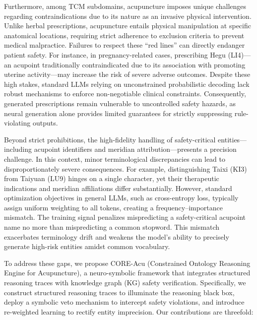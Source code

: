 \documentclass[preprint,5p,times,twocolumn,fleqn]{elsarticle}
\begin{document}
Furthermore, among TCM subdomains, acupuncture imposes unique challenges regarding contraindications due to its nature as an invasive physical intervention. 
Unlike herbal prescriptions, acupuncture entails physical manipulation at specific anatomical locations, requiring strict adherence to exclusion criteria to prevent medical malpractice.
Failures to respect these ``red lines'' can directly endanger patient safety. 
For instance, in pregnancy-related cases, prescribing Hegu (LI4)---an acupoint traditionally contraindicated due to its association with promoting uterine activity---may increase the risk of severe adverse outcomes. 
Despite these high stakes, standard LLMs relying on unconstrained probabilistic decoding lack robust mechanisms to enforce non-negotiable clinical constraints.
Consequently, generated prescriptions remain vulnerable to uncontrolled safety hazards, as neural generation alone provides limited guarantees for strictly suppressing rule-violating outputs.

Beyond strict prohibitions, the high-fidelity handling of safety-critical entities---including acupoint identifiers and meridian attribution---presents a precision challenge.
In this context, minor terminological discrepancies can lead to disproportionately severe consequences. 
For example, distinguishing Taixi (KI3) from Taiyuan (LU9) hinges on a single character, yet their therapeutic indications and meridian affiliations differ substantially. 
However, standard optimization objectives in general LLMs, such as cross-entropy loss, typically assign uniform weighting to all tokens, creating a frequency--importance mismatch.
The training signal penalizes mispredicting a safety-critical acupoint name no more than mispredicting a common stopword. 
This mismatch exacerbates terminology drift and weakens the model's ability to precisely generate high-risk entities amidst common vocabulary.


To address these gaps, we propose CORE-Acu (Constrained Ontology Reasoning Engine for Acupuncture), a neuro-symbolic framework that integrates structured reasoning traces with knowledge graph (KG) safety verification. 
Specifically, we construct structured reasoning traces to illuminate the reasoning black box, deploy a symbolic veto mechanism to intercept safety violations, and introduce re-weighted learning to rectify entity imprecision.
Our contributions are threefold:
\end{document}
